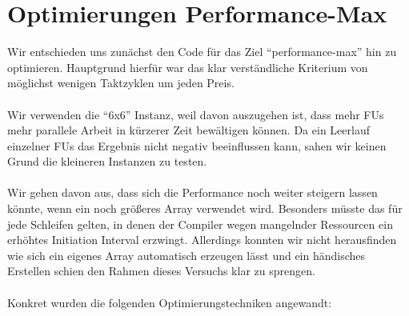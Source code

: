 \documentclass[oneside,11pt,accentcolor=tud2b, nochapname]{tudexercise}
\begin{document}
\section*{Optimierungen Performance-Max}
Wir entschieden uns zunächst den Code für das Ziel "`performance-max"' hin zu optimieren.
Hauptgrund hierfür war das klar verständliche Kriterium von möglichst wenigen Taktzyklen um jeden Preis.\\
\\
Wir verwenden die "`6x6"' Instanz, weil davon auszugehen ist, dass mehr FUs mehr parallele Arbeit in kürzerer Zeit bewältigen können.
Da ein Leerlauf einzelner FUs das Ergebnis nicht negativ beeinflussen kann, sahen wir keinen Grund die kleineren Instanzen zu testen.\\
\\
Wir gehen davon aus, dass sich die Performance noch weiter steigern lassen könnte, wenn ein noch größeres Array verwendet wird.
Besonders müsste das für jede Schleifen gelten, in denen der Compiler wegen mangelnder Ressourcen ein erhöhtes Initiation Interval erzwingt.
Allerdings konnten wir nicht herausfinden wie sich ein eigenes Array automatisch erzeugen lässt und ein händisches Erstellen schien den Rahmen dieses Versuchs klar zu sprengen.\\
\\
Konkret wurden die folgenden Optimierungstechniken angewandt:
\end{document}
